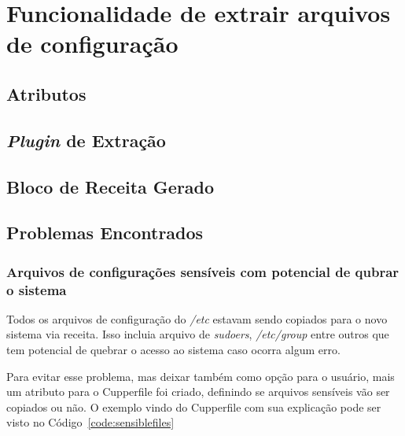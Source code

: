 \section{Funcionalidade de extrair arquivos de configuração}
\label{sec:files}
\subsection{Atributos}
\subsection{\textit{Plugin} de Extração}
\subsection{Bloco de Receita Gerado}
\subsection{Problemas Encontrados}

\subsubsection{Arquivos de configurações sensíveis com potencial de qubrar o sistema}
Todos os arquivos de configuração do \textit{/etc} estavam sendo copiados para
o novo sistema via receita. Isso incluia arquivo de \textit{sudoers}, \textit{/etc/group}
entre outros que tem potencial de quebrar o acesso ao sistema caso ocorra algum erro.

Para evitar esse problema, mas deixar também como opção para o usuário, mais um
atributo para o Cupperfile foi criado, definindo se arquivos sensíveis vão ser
copiados ou não. O exemplo vindo do Cupperfile com sua explicação pode ser visto no
Código~\ref{code:sensiblefiles}

\noindent\begin{minipage}{\textwidth}
  \lstset{style=shell}
  
\end{minipage}\hfill
